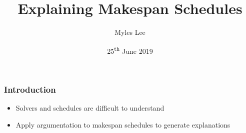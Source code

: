 \documentclass[11pt]{beamer}
\begin{document}
	\author{Myles Lee}
	\title{Explaining Makespan Schedules}
	\date{25\textsuperscript{th} June 2019}
	
	\begin{frame}[plain]
		\maketitle
	\end{frame}
	
	\begin{frame}
		\frametitle{Introduction}
		\begin{itemize}
			\item Solvers and schedules are difficult to understand
			\item Apply argumentation to makespan schedules to generate explanations
		\end{itemize}
	\end{frame}
\end{document}
